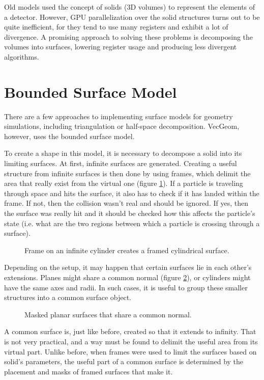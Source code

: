 \documentclass[12pt, a4paper]{article}
\begin{document}
Old models used the concept of solids (3D volumes) to represent the elements of a detector. However, GPU parallelization over the solid structures turns out to be quite inefficient, for they tend to use many registers and exhibit a lot of divergence. A promising approach to solving these problems is decomposing the volumes into surfaces, lowering register usage and producing less divergent algorithms.


\section{Bounded Surface Model}

There are a few approaches to implementing surface models for geometry simulations, including triangulation or half-space decomposition. VecGeom, however, uses the bounded surface model.

To create a shape in this model, it is necessary to decompose a solid into its limiting surfaces. At first, infinite surfaces are generated. Creating a useful structure from infinite surfaces is then done by using frames, which delimit the area that really exist from the virtual one (figure \ref{fig:mask}). If a particle is traveling through space and hits the surface, it also has to check if it has landed within the frame. If not, then the collision wasn't real and should be ignored. If yes, then the surface was really hit and it should be checked how this affects the particle's state (i.e. what are the two regions between which a particle is crossing through a surface).
\begin{figure}[h]
	\centering
	
	\caption{Frame on an infinite cylinder creates a framed cylindrical surface.}
	\label{fig:mask}
\end{figure}

Depending on the setup, it may happen that certain surfaces lie in each other's extensions. Planes might share a common normal (figure \ref{fig:commonSurf}), or cylinders might have the same axes and radii. In such cases, it is useful to group these smaller structures into a common surface object.
\begin{figure}[h]
	\centering
	
	\caption{Masked planar surfaces that share a common normal.}
	\label{fig:commonSurf}
\end{figure}

A common surface is, just like before, created so that it extends to infinity. That is not very practical, and a way must be found to delimit the useful area from its virtual part. Unlike before, when frames were used to limit the surfaces based on solid's parameters, the useful part of a common surface is determined by the placement and masks of framed surfaces that make it.
\end{document}
